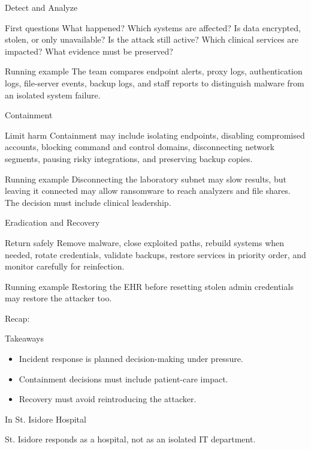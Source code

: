 \documentclass[presentation]{beamer}
\newcommand{\scenario}{St. Isidore Hospital}
\newcommand{\takeawaysframe}[2]{
\begin{frame}[c]{Recap: \insertsection}
\begin{block}{Takeaways}
#1
\end{block}
\begin{exampleblock}{In \scenario}
#2
\end{exampleblock}
\end{frame}
}
\begin{document}
\begin{frame}[c]{Detect and Analyze}
\begin{block}{First questions}
What happened? Which systems are affected? Is data encrypted, stolen, or only unavailable? Is the
attack still active? Which clinical services are impacted? What evidence must be preserved?
\end{block}

\begin{exampleblock}{Running example}
The team compares endpoint alerts, proxy logs, authentication logs, file-server events, backup logs,
and staff reports to distinguish malware from an isolated system failure.
\end{exampleblock}
\end{frame}

\begin{frame}[c]{Containment}
\begin{block}{Limit harm}
Containment may include isolating endpoints, disabling compromised accounts, blocking command and
control domains, disconnecting network segments, pausing risky integrations, and preserving backup
copies.
\end{block}

\begin{exampleblock}{Running example}
Disconnecting the laboratory subnet may slow results, but leaving it connected may allow ransomware
to reach analyzers and file shares. The decision must include clinical leadership.
\end{exampleblock}
\end{frame}

\begin{frame}[c]{Eradication and Recovery}
\begin{block}{Return safely}
Remove malware, close exploited paths, rebuild systems when needed, rotate credentials, validate
backups, restore services in priority order, and monitor carefully for reinfection.
\end{block}

\begin{exampleblock}{Running example}
Restoring the EHR before resetting stolen admin credentials may restore the attacker too.
\end{exampleblock}
\end{frame}

\takeawaysframe{
\begin{itemize}
    \item Incident response is planned decision-making under pressure.
    \item Containment decisions must include patient-care impact.
    \item Recovery must avoid reintroducing the attacker.
\end{itemize}
}{
St. Isidore responds as a hospital, not as an isolated IT department.
}
\end{document}
